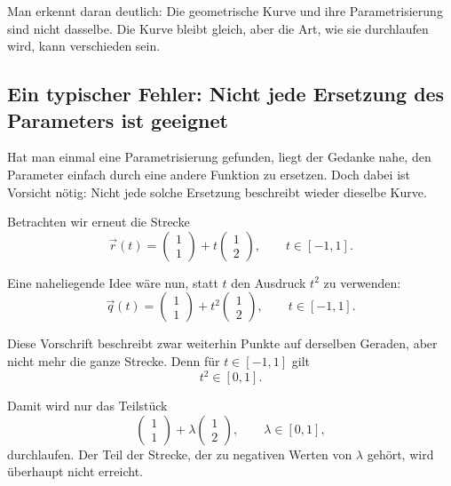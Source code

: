 Man erkennt daran deutlich:
Die geometrische Kurve und ihre Parametrisierung sind nicht dasselbe.
Die Kurve bleibt gleich,
aber die Art, wie sie durchlaufen wird, kann verschieden sein.



\subsection{Ein typischer Fehler: Nicht jede Ersetzung des Parameters ist geeignet}

Hat man einmal eine Parametrisierung gefunden,
liegt der Gedanke nahe, den Parameter einfach durch eine andere Funktion zu ersetzen.
Doch dabei ist Vorsicht nötig:
Nicht jede solche Ersetzung beschreibt wieder dieselbe Kurve.

Betrachten wir erneut die Strecke
\[
\vec r(t)=
\begin{pmatrix}
	1\\
	1
\end{pmatrix}
+t
\begin{pmatrix}
	1\\
	2
\end{pmatrix},
\qquad t\in[-1,1].
\]

Eine naheliegende Idee wäre nun,
statt \(t\) den Ausdruck \(t^2\) zu verwenden:
\[
\vec q(t)=
\begin{pmatrix}
	1\\
	1
\end{pmatrix}
+t^2
\begin{pmatrix}
	1\\
	2
\end{pmatrix},
\qquad t\in[-1,1].
\]

Diese Vorschrift beschreibt zwar weiterhin Punkte auf derselben Geraden,
aber nicht mehr die ganze Strecke.
Denn für \(t\in[-1,1]\) gilt
\[
t^2\in[0,1].
\]

Damit wird nur das Teilstück
\[
\begin{pmatrix}
	1\\
	1
\end{pmatrix}
+\lambda
\begin{pmatrix}
	1\\
	2
\end{pmatrix},
\qquad \lambda\in[0,1],
\]
durchlaufen.
Der Teil der Strecke, der zu negativen Werten von \(\lambda\) gehört,
wird überhaupt nicht erreicht.

